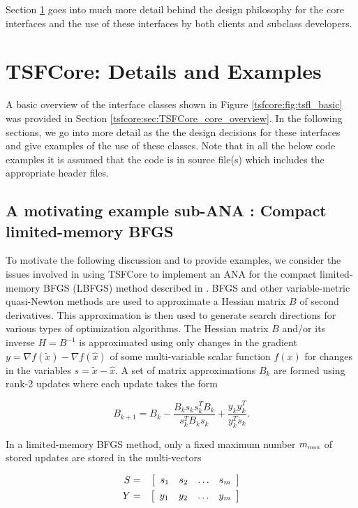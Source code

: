 Section \ref{tsfcore:sec:TSFCore_Details} goes into much more detail behind
the design philosophy for the core interfaces and the use of these
interfaces by both clients and subclass developers.

%
\section{TSFCore: Details and Examples}
\label{tsfcore:sec:TSFCore_Details}
%

A basic overview of the interface classes shown in Figure
\ref{tsfcore:fig:tsfl_basic} was provided in Section
\ref{tsfcore:sec:TSFCore_core_overview}.  In the following sections, we go into
more detail as the the design decisions for these interfaces and give
examples of the use of these classes.  Note that in all the below code
examples it is assumed that the code is in source file(s) which
includes the appropriate header files.

%
\subsection{A motivating example sub-ANA : Compact limited-memory BFGS}
\label{tsfcore:sec:LBFGS}
%

To motivate the following discussion and to provide examples, we
consider the issues involved in using TSFCore to implement an ANA for the
compact limited-memory BFGS (LBFGS) method described in
\cite{ref:byrd_et_all_lbfgs_1994}.  BFGS and other variable-metric
quasi-Newton methods are used to approximate a Hessian matrix $B$ of
second derivatives.  This approximation is then used to generate
search directions for various types of optimization algorithms.  The
Hessian matrix $B$ and/or its inverse $H = B^{-1}$ is approximated
using only changes in the gradient $y = \nabla f(\tilde{x}) - \nabla
f(\hat{x})$ of some multi-variable scalar function $f(x)$ for changes
in the variables $s = \tilde{x} - \hat{x}$.  A set of matrix
approximations $B_k$ are formed using rank-2 updates where each update
takes the form

\begin{equation}
B_{k+1} = B_k - \frac{B_k s_k s_k^T B_k}{s_k^T B_k s_k} + \frac{y_k y_k^T}{y_k^T s_k}.
\end{equation}

In a limited-memory BFGS method, only a fixed maximum number
$m_{\tiny\mbox{max}}$ of stored updates are stored in the multi-vectors

\begin{eqnarray}
S & = & {\bmat{cccc} s_1 & s_2 & \ldots & s_{m} \emat} \\
Y & = & {\bmat{cccc} y_1 & y_2 & \ldots & y_{m} \emat}
\end{eqnarray}

